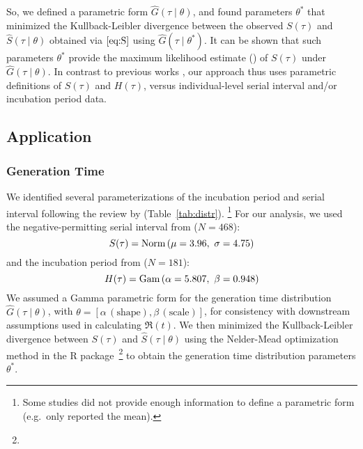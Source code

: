 So, we defined a parametric form ${\hat{G}(\tau\mid\theta)}$,
and found parameters $\theta^*$ that
minimized the Kullback-Leibler divergence between
the observed $S(\tau)$ and ${\hat{S}(\tau\mid\theta)}$
obtained via $\eqref{eq:S}$ using ${\hat{G}(\tau\mid\theta^*)}$.
It can be shown that such parameters $\theta^*$
provide the maximum likelihood estimate (\mle) of
$S(\tau)$ under $\hat{G}(\tau\mid\theta)$.
In contrast to previous works \cite{Kuk2005,Britton2019,Ganyani2020},
our approach thus uses parametric definitions of $S(\tau)$ and $H(\tau)$,
versus individual-level serial interval and/or incubation period data.
\subsection{Application}
\subsubsection{Generation Time}
We identified several parameterizations of
the \covid incubation period and serial interval
following the review by \textcite{Park2020} (Table~\ref{tab:distr}).%
\footnote{Some studies did not provide enough information
  to define a parametric form (e.g.\ only reported the mean).}
For our analysis, we used
the negative-permitting serial interval from \cite{Du2020} ({$N=468$}):
\begin{equation}
S(\tau) = \mathop{\mathrm{Norm}}{\left(\mu=3.96,~\sigma=4.75\right)}
\end{equation}
and the incubation period from \cite{Lauer2020} ({$N=181$}):
\begin{equation}
H(\tau) = \mathop{\mathrm{Gam}}{\left(\alpha=5.807,~\beta=0.948\right)}
\end{equation}
We assumed a Gamma parametric form for the generation time distribution
${\hat{G}(\tau\mid\theta)}$, with
$\theta = [\alpha\,(\textrm{shape}), \beta\,(\textrm{scale})]$,
for consistency with downstream assumptions used in calculating $\Re(t)$.
We then minimized the Kullback-Leibler divergence between
$S(\tau)$ and $\hat{S}(\tau\mid\theta)$ using
the Nelder-Mead optimization method
in the  R package\,%
\footnote{}
to obtain the \mle generation time distribution parameters $\theta^*$.
